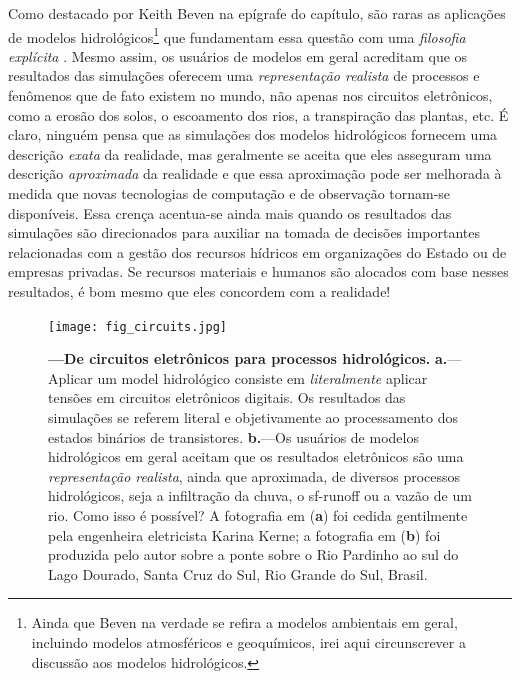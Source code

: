 \documentclass[./main.tex]{subfiles}
\begin{document}
\par Como destacado por Keith Beven na epígrafe do capítulo, são raras as aplicações de modelos hidrológicos\footnote{Ainda que Beven na verdade se refira a modelos ambientais em geral, incluindo modelos atmosféricos e geoquímicos, irei aqui circunscrever a discussão aos modelos hidrológicos.} que fundamentam essa questão com uma \textit{filosofia explícita} \cite{Beven2002a}. Mesmo assim, os usuários de modelos em geral acreditam que os resultados das simulações oferecem uma \textit{representação realista} de processos e fenômenos que de fato existem no mundo, não apenas nos circuitos eletrônicos, como a erosão dos solos, o escoamento dos rios, a transpiração das plantas, etc. É claro, ninguém pensa que as simulações dos modelos hidrológicos fornecem uma descrição \textit{exata} da realidade, mas geralmente se aceita que eles asseguram uma descrição \textit{aproximada} da realidade e que essa aproximação pode ser melhorada à medida que novas tecnologias de computação e de observação tornam-se disponíveis. Essa crença acentua-se ainda mais quando os resultados das simulações são direcionados para auxiliar na tomada de decisões importantes relacionadas com a gestão dos recursos hídricos em organizações do Estado ou de empresas privadas. Se recursos materiais e humanos são alocados com base nesses resultados, é bom mesmo que eles concordem com a realidade! 

\begin{figure}[t!] %
	\centering				
	\texttt{[image: fig\_circuits.jpg]}		
	\caption[De circuitos eletrônicos para processos hidrológicos]
	{\textbf{---\;De circuitos eletrônicos para processos hidrológicos.}
        \;\textbf{a.}\;---\;Aplicar um \gls{model} hidrológico consiste em \textit{literalmente} aplicar tensões em circuitos eletrônicos digitais. Os resultados das simulações se referem literal e objetivamente ao processamento dos estados binários de transistores. \;\textbf{b.}\;---\;Os usuários de modelos hidrológicos em geral aceitam que os resultados eletrônicos são uma \textit{representação realista}, ainda que aproximada, de diversos processos hidrológicos, seja a infiltração da chuva, o \gls{sf-runoff} ou a vazão de um rio. Como isso é possível? A fotografia em (\textbf{a}) foi cedida gentilmente pela engenheira eletricista Karina Kerne; a fotografia em (\textbf{b}) foi produzida pelo autor sobre a ponte sobre o Rio Pardinho ao sul do Lago Dourado, Santa Cruz do Sul, Rio Grande do Sul, Brasil.
	}
\label{fig:circuits}  %
\end{figure}
\end{document}
